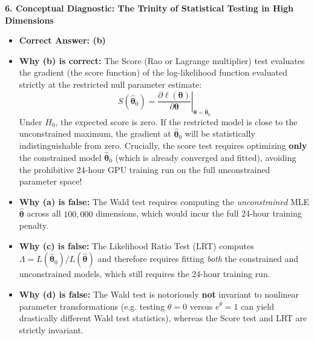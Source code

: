 \textbf{6. Conceptual Diagnostic: The Trinity of Statistical Testing in High Dimensions}
\begin{itemize}
    \item \textbf{Correct Answer: (b)}
    \item \textbf{Why (b) is correct:} The Score (Rao or Lagrange multiplier) test evaluates the gradient (the score function) of the log-likelihood function evaluated strictly at the restricted null parameter estimate:
    $$S(\hat{\boldsymbol{\theta}}_0) = \left.\frac{\partial \ell(\boldsymbol{\theta})}{\partial \boldsymbol{\theta}}\right|_{\boldsymbol{\theta} = \hat{\boldsymbol{\theta}}_0}$$
    Under $H_0$, the expected score is zero. If the restricted model is close to the unconstrained maximum, the gradient at $\hat{\boldsymbol{\theta}}_0$ will be statistically indistinguishable from zero. Crucially, the score test requires optimizing \textbf{only} the constrained model $\hat{\boldsymbol{\theta}}_0$ (which is already converged and fitted), avoiding the prohibitive 24-hour GPU training run on the full unconstrained parameter space!
    \item \textbf{Why (a) is false:} The Wald test requires computing the \emph{unconstrained} MLE $\hat{\boldsymbol{\theta}}$ across all $100{,}000$ dimensions, which would incur the full 24-hour training penalty.
    \item \textbf{Why (c) is false:} The Likelihood Ratio Test (LRT) computes $\Lambda = L(\hat{\boldsymbol{\theta}}_0) / L(\hat{\boldsymbol{\theta}})$ and therefore requires fitting \emph{both} the constrained and unconstrained models, which still requires the 24-hour training run.
    \item \textbf{Why (d) is false:} The Wald test is notoriously \textbf{not} invariant to nonlinear parameter transformations (e.g. testing $\theta = 0$ versus $e^\theta = 1$ can yield drastically different Wald test statistics), whereas the Score test and LRT are strictly invariant.
\end{itemize}

